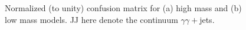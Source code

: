 \begin{figure}[htbp]
    \centering
    \begin{tcolorbox}[colback=black!5!white,colframe=white!75!black]
    \caption{Normalized (to unity) confusion matrix for (a) high mass and (b) low mass models. JJ here denote the continuum $\gamma\gamma+$jets.}
    \label{fig:HHyybb:ObjEvt:DNN:CM}
    \end{tcolorbox}
    
\end{figure}


